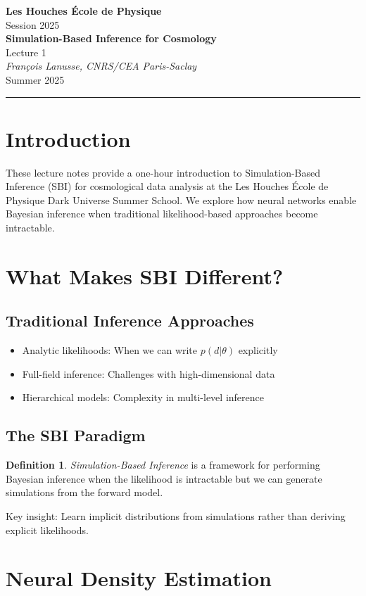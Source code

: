 \documentclass[11pt,a4paper]{article}
\makeatletter
\theoremstyle{definition}
\newtheorem{definition}{Definition}[section]
\newcommand{\lecturetitle}[1]{\gdef\@lecturetitle{#1}}
\newcommand{\lecturer}[1]{\gdef\@lecturer{#1}}
\newcommand{\lecturedate}[1]{\gdef\@lecturedate{#1}}
\newcommand{\lecturenumber}[1]{\gdef\@lecturenumber{#1}\gdef\thelecturenumber{#1}}
\gdef\@lecturetitle{Lecture Title}
\gdef\@lecturer{Lecturer Name}
\gdef\@lecturedate{\today}
\gdef\@lecturenumber{1}
\renewcommand{\maketitle}{
    \begin{center}
        {\Large\textcolor{leshouches}{\textbf{Les Houches École de Physique}}}\\[0.5em]
        {\large Session 2025}\\[1.5em]
        {\huge\textbf{\@lecturetitle}}\\[0.5em]
        {\large Lecture \@lecturenumber}\\[1em]
        {\large\textit{\@lecturer}}\\[0.5em]
        {\@lecturedate}
    \end{center}
    \vspace{1em}
    \hrule
    \vspace{1.5em}
}
\makeatother
\begin{document}
\lecturetitle{Simulation-Based Inference for Cosmology}
\lecturer{François Lanusse, CNRS/CEA Paris-Saclay}
\lecturedate{Summer 2025}
\lecturenumber{1}

\maketitle

\section{Introduction}

These lecture notes provide a one-hour introduction to Simulation-Based Inference (SBI) for cosmological data analysis at the Les Houches École de Physique Dark Universe Summer School. We explore how neural networks enable Bayesian inference when traditional likelihood-based approaches become intractable.

\section{What Makes SBI Different?}

\subsection{Traditional Inference Approaches}
\begin{itemize}
    \item Analytic likelihoods: When we can write $p(d|\theta)$ explicitly
    \item Full-field inference: Challenges with high-dimensional data
    \item Hierarchical models: Complexity in multi-level inference
\end{itemize}

\subsection{The SBI Paradigm}
\begin{definition}
\emph{Simulation-Based Inference} is a framework for performing Bayesian inference when the likelihood is intractable but we can generate simulations from the forward model.
\end{definition}

Key insight: Learn implicit distributions from simulations rather than deriving explicit likelihoods.

\section{Neural Density Estimation}
\end{document}
